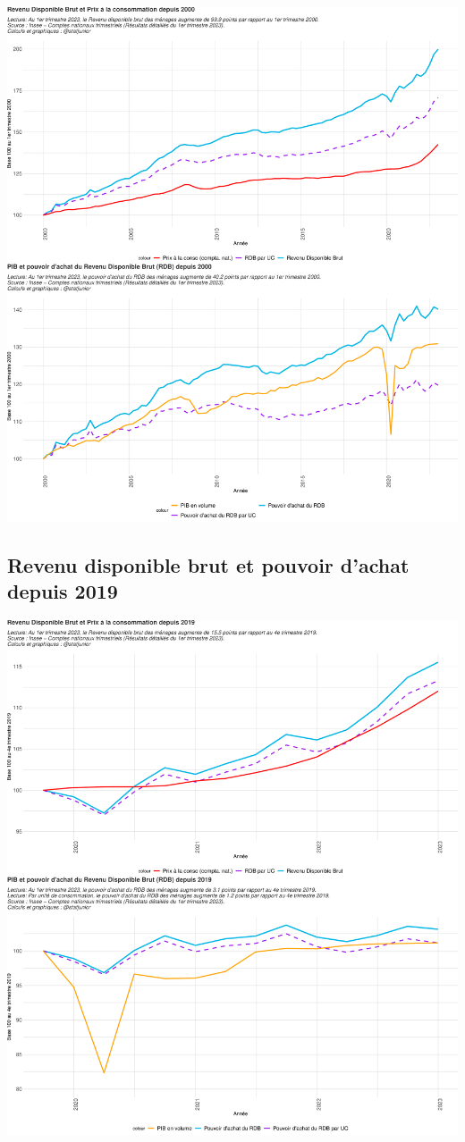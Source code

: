 \documentclass[
  paper=a4,
  ,captions=tableheading
]{scrartcl}
\begin{document}
\includegraphics{rapport_pdf_csi_files/figure-latex/unnamed-chunk-2-1.pdf}

\hypertarget{revenu-disponible-brut-et-pouvoir-dachat-depuis-2019}{%
\subsection{Revenu disponible brut et pouvoir d'achat depuis
2019}\label{revenu-disponible-brut-et-pouvoir-dachat-depuis-2019}}

\includegraphics{rapport_pdf_csi_files/figure-latex/unnamed-chunk-3-1.pdf}
\end{document}
